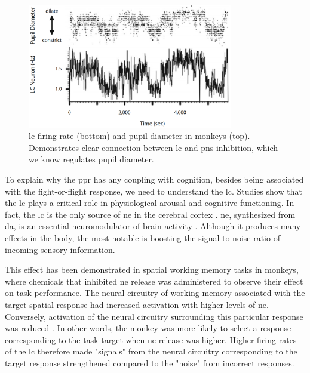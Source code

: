 \begin{figure}[h]
    \centering
    \includegraphics[width=0.8\textwidth]{figures/bt_LC_correlation.png}
    \caption{\acrlong{lc} firing rate (bottom) and pupil diameter in monkeys (top). Demonstrates clear connection between \acrshort{lc} and \acrshort{pns} inhibition, which we know regulates pupil diameter.}
    \label{fig:bt_lc_corr}
\end{figure}

To explain why the \acrshort{ppr} has any coupling with cognition, besides being associated with the fight-or-flight response, we need to understand the \acrlong{lc}. Studies show that the \acrshort{lc} plays a critical role in physiological arousal and cognitive functioning. In fact, the \acrshort{lc} is the only source of \acrfull{ne} in the cerebral cortex \cite{sara2009}. \acrshort{ne}, synthesized from \acrfull{da}, is an essential neuromodulator of brain activity \cite{aminoff2014}. Although it produces many effects in the body, the most notable is boosting the signal-to-noise ratio of incoming sensory information. 

This effect has been demonstrated in spatial working memory tasks in monkeys, where chemicals that inhibited \acrshort{ne} release was administered to observe their effect on task performance. The neural circuitry of working memory associated with the target spatial response had increased activation with higher levels of \acrshort{ne}. Conversely, activation of the neural circuitry surrounding this particular response was reduced \cite{ramos2007}. In other words, the monkey was more likely to select a response corresponding to the task target when \acrshort{ne} release was higher. Higher firing rates of the \acrshort{lc} therefore made "signals" from the neural circuitry corresponding to the target response strengthened compared to the "noise" from incorrect responses.

